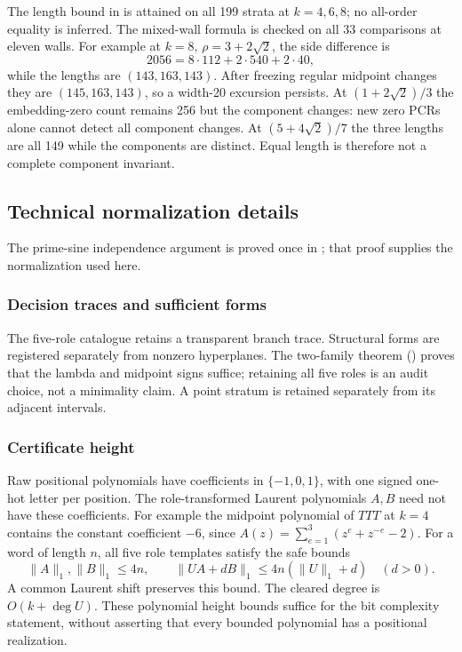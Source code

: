 The length bound in  is attained on all 199 strata
at $k=4,6,8$; no all-order equality is inferred. The mixed-wall
formula is checked on all 33 comparisons at eleven walls.
For example at $k=8$, $\rho=3+2\sqrt2$, the side difference is
\[
2056=8\cdot112+2\cdot540+2\cdot40,
\]
while the lengths are $(143,163,143)$. After freezing regular
midpoint changes they are $(145,163,143)$, so a width-20 excursion
persists. At $(1+2\sqrt2)/3$ the embedding-zero count remains 256
but the component changes: new zero PCRs alone cannot detect all
component changes. At $(5+4\sqrt2)/7$ the three lengths are all
149 while the components are distinct. Equal length is therefore
not a complete component invariant.


\subsection{Technical normalization details}
\label{app:component-details}

The prime-sine independence argument is proved once in ; that proof supplies the normalization used here.

\subsubsection{Decision traces and sufficient forms}
The five-role catalogue retains a transparent branch trace. Structural forms
are registered separately from nonzero hyperplanes. The two-family theorem
() proves that the lambda and midpoint signs suffice;
retaining all five roles is an audit choice, not a minimality claim.
A point stratum is retained separately from its adjacent intervals.

\subsubsection{Certificate height}
Raw positional polynomials have coefficients in $\{-1,0,1\}$, with one
signed one-hot letter per position. The role-transformed Laurent
polynomials $A,B$ need not have these coefficients. For example the
midpoint polynomial of $TTT$ at $k=4$ contains the constant coefficient
$-6$, since $A(z)=\sum_{e=1}^3(z^e+z^{-e}-2)$.
For a word of length $n$, all five role templates satisfy the safe bounds
\[
 \|A\|_1,\|B\|_1\le4n,\qquad
 \|UA+dB\|_1\le4n(\|U\|_1+d)\quad(d>0).
\]
A common Laurent shift preserves this bound. The cleared degree is
$O(k+\deg U)$. These polynomial height bounds suffice for the bit
complexity statement, without asserting that every bounded polynomial
has a positional realization.

